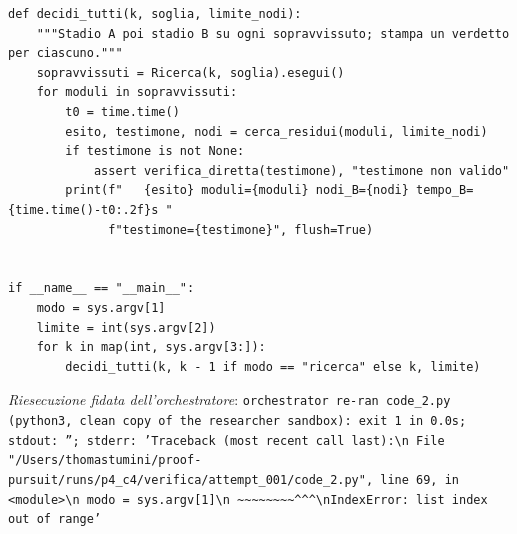 \documentclass[11pt,a4paper]{article}
\begin{document}
\begin{lstlisting}[caption={attempt\_001 code\_2 [python, rigore exact] — Stage B: for each stage-A survivor, exhaustive backtracking on residues (a\_1 = 0 by Lemma  — verdetto del Referee: UNKNOWN\_STATUS}]
def decidi_tutti(k, soglia, limite_nodi):
    """Stadio A poi stadio B su ogni sopravvissuto; stampa un verdetto per ciascuno."""
    sopravvissuti = Ricerca(k, soglia).esegui()
    for moduli in sopravvissuti:
        t0 = time.time()
        esito, testimone, nodi = cerca_residui(moduli, limite_nodi)
        if testimone is not None:
            assert verifica_diretta(testimone), "testimone non valido"
        print(f"   {esito} moduli={moduli} nodi_B={nodi} tempo_B={time.time()-t0:.2f}s "
              f"testimone={testimone}", flush=True)


if __name__ == "__main__":
    modo = sys.argv[1]
    limite = int(sys.argv[2])
    for k in map(int, sys.argv[3:]):
        decidi_tutti(k, k - 1 if modo == "ricerca" else k, limite)

\end{lstlisting}
\noindent\emph{Riesecuzione fidata dell'orchestratore}: \texttt{orchestrator re-ran code\_2.py (python3, clean copy of the researcher sandbox): exit 1 in 0.0s; stdout: ''; stderr: 'Traceback (most recent call last):\textbackslash{}n  File "/Users/thomastumini/proof-pursuit/runs/p4\_c4/verifica/attempt\_001/code\_2.py", line 69, in \textless{}module\textgreater{}\textbackslash{}n    modo = sys.argv[1]\textbackslash{}n           \textasciitilde{}\textasciitilde{}\textasciitilde{}\textasciitilde{}\textasciitilde{}\textasciitilde{}\textasciitilde{}\textasciitilde{}\textasciicircum{}\textasciicircum{}\textasciicircum{}\textbackslash{}nIndexError: list index out of range'}
\end{document}
